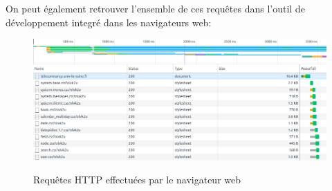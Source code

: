 \documentclass[a4paper,11pt, oneside]{book}
\def\widthImage{1}
\begin{document}
		On peut également retrouver l'ensemble de ces requêtes dans l'outil de développement integré dans les navigateurs web:

		\begin{figure} [htbp]
			\centering
			\includegraphics[width=\widthImage\textwidth]{3.png}\\
			\caption{Requêtes HTTP effectuées par le navigateur web}
		\end{figure}
\end{document}
